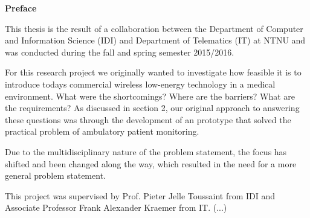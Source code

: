 \begin{0_preface}

	\noindent \textbf{Preface}
  \newline
  	
\noindent  
This thesis is the result of a collaboration between the Department of Computer and Information Science (IDI) and Department of Telematics (IT) at NTNU and was conducted during the fall and spring semester 2015/2016.

For this research project we originally wanted to investigate how feasible it is to introduce todays commercial wireless low-energy technology in a medical environment. What were the shortcomings? Where are the barriers? What are the requirements? As discussed in section 2, our original approach to answering these questions was through the development of an prototype that solved the practical problem of ambulatory patient monitoring.

Due to the multidisciplinary nature of the problem statement, the focus has shifted and been changed along the way, which resulted in the need for a more general problem statement.

This project was supervised by Prof. Pieter Jelle Toussaint from IDI and Associate Professor Frank Alexander Kraemer from IT.
  (...)
  
\end{0_preface}